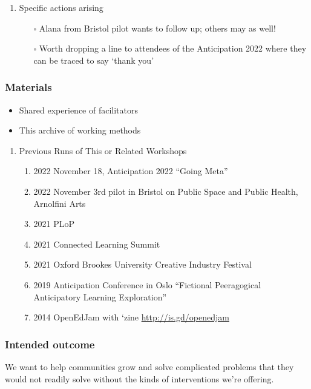 \documentclass{article}
\begin{document}
\begin{enumerate}
\item Specific actions arising

\begin{itemize}
\item[{$\square$}] Alana from Bristol pilot wants to follow up; others may as well!
\item[{$\square$}] Worth dropping a line to attendees of the Anticipation 2022 where they can be traced to say ‘thank you’
\end{itemize}
\end{enumerate}

\subsubsection{Materials}

\begin{itemize}
\item Shared experience of facilitators
\item This archive of working methods
\end{itemize}

\begin{enumerate}
\item Previous Runs of This or Related Workshops
\begin{enumerate}
\item 2022 November 18, Anticipation 2022 ``Going Meta''
\item 2022 November 3rd pilot in Bristol on Public Space and Public Health, Arnolfini Arts
\item 2021 PLoP
\item 2021 Connected Learning Summit
\item 2021 Oxford Brookes University Creative Industry Festival
\item 2019 Anticipation Conference in Oslo “Fictional Peeragogical Anticipatory Learning Exploration”
\item 2014 OpenEdJam with ‘zine \url{http://is.gd/openedjam}
\end{enumerate}
\end{enumerate}


\subsubsection{Intended outcome}
We want to help communities grow and solve complicated problems that they would not readily solve without the kinds of interventions we’re offering.
\end{document}
